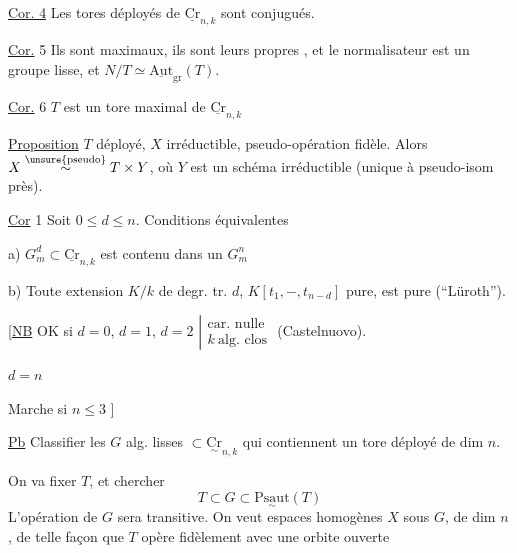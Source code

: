 \uline{Cor. 4} Les tores déployés  de $\underline{\mathrm{Cr}}_{n,k}$ sont conjugués.

\uline{Cor.} 5 Ils sont maximaux, ils sont leurs propres , et le normalisateur est un groupe  lisse, et $N/T\simeq\underline{\mathrm{Aut}}_{\mathrm{gr}}(T)$.

\uline{Cor.} 6 $T$ est un tore maximal de $\underline{\mathrm{Cr}}_{n,k}$

\uline{Proposition} $T$ déployé, $X$ irréductible, pseudo-opération fidèle. Alors $X\overset{\text{\unsure{pseudo}}}{\sim}T\times Y$, où $Y$ est un schéma irréductible (unique à pseudo-isom près).

\uline{Cor} 1 Soit $0\leq d\leq n$. Conditions équivalentes

a)  $G_m^d\subset\underline{\mathrm{Cr}}_{n,k}$ est contenu dans un $G_m^n$

b) Toute extension $K/k$ de degr. tr. $d$,  $K[t_1,-,t_{n-d}]$ pure, est pure (``Lüroth'').

[\uline{NB} \quad OK si $d=0$, $d=1$, $d=2$ $\left|\begin{array}{l}\text{car. nulle}\\ k\ \text{alg. clos}\end{array}\right.$ (Castelnuovo).

\hspace*{4em}$d=n$

Marche si $n\leq 3$ \quad ]

\uline{Pb} Classifier les $G$ alg. lisses $\subset\underset{\sim}{\mathrm{Cr}}_{n,k}$ qui contiennent un tore déployé de dim $n$.

\uline{}

On va fixer $T$, et chercher
\[
T\subset G\subset\underset{\sim}{\mathrm{Psaut}}(T)
\]
L'opération de $G$ sera transitive. On veut espaces homogènes $X$ sous $G$, de dim $n$, de telle façon que $T$ opère fidèlement avec une orbite ouverte

